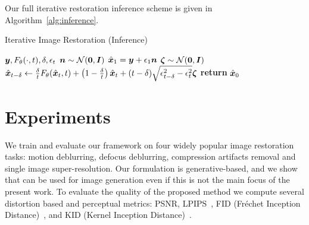 \documentclass[10pt]{article} %
\begin{document}
Our full iterative restoration inference scheme is given in Algorithm~\ref{alg:inference}.



















  \begin{algorithm}[t]
  \caption{Iterative Image Restoration (Inference)} 
  \label{alg:inference}
  \begin{algorithmic}
    \Require ${\bm{y}}, F_\theta(\cdot, t), \delta, \epsilon_t$
     \State ${\bm{n}} \sim \mathcal N({\bm{0}}, {\bm{I}})$
     \State $\hat {{\bm{x}}}_1 = {\bm{y}} + \epsilon_1 {\bm{n}}$
      \State ${\bm{\zeta}} \sim \mathcal N({\bm{0}}, {\bm{I}})$
      \State $\hat {{\bm{x}}}_{t - \delta} \gets \frac{\delta}{t} F_\theta(\hat {{\bm{x}}}_t, t) + \left(1 - \frac{\delta}{t} \right) \hat {{\bm{x}}}_t +(t-\delta)\sqrt{\epsilon_{t-\delta}^2 - \epsilon_t^2}{\bm{\zeta}}$  
    \EndFor
    \State \textbf{return} $\hat {{\bm{x}}}_0$
  \end{algorithmic}
  \end{algorithm}





















  


\section{Experiments}
\label{sec:experiments}
We train and evaluate our framework on four widely popular image restoration tasks: motion deblurring, defocus deblurring, compression artifacts removal and single image super-resolution. Our formulation is generative-based, and we show that can be used for image generation even if this is not the main focus of the present work.
To evaluate the quality of the proposed method we compute several distortion based and perceptual metrics: PSNR, LPIPS~\citep{zhang2018perceptual}, FID (Fréchet Inception Distance)~\citep{heusel2017gans}, and KID (Kernel Inception Distance)~\citep{binkowski2018demystifying}.
\end{document}
